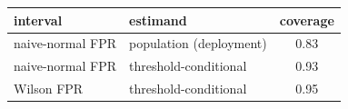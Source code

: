 \begin{tabular*}{\tabwidth}{@{\extracolsep{\fill}}llc@{}}
\toprule
interval & estimand & coverage\\
\midrule
naive-normal FPR & population (deployment) & 0.83\\
naive-normal FPR & threshold-conditional & 0.93\\
Wilson FPR & threshold-conditional & 0.95\\
\bottomrule
\end{tabular*}
